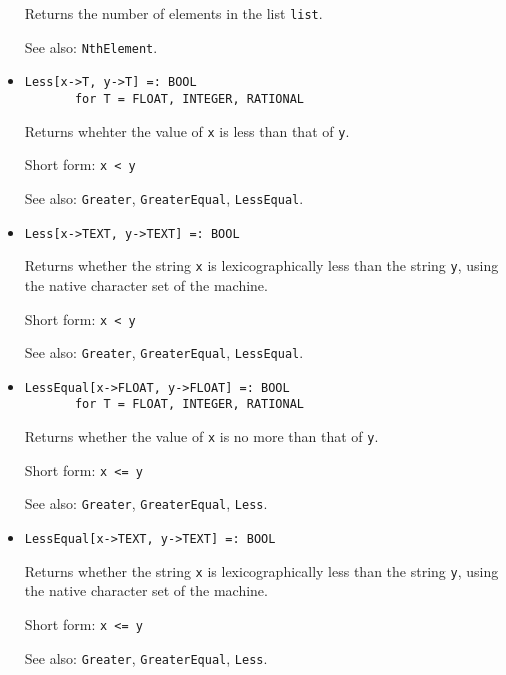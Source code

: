 \begin{itemize}
\bd
Returns the number of elements in the list \verb+list+.
\item
[See also:] {\tt NthElement}.
\ed

\item
\protect \large \begin{verbatim}
Less[x->T, y->T] =: BOOL
       for T = FLOAT, INTEGER, RATIONAL
\end{verbatim}\normalsize

\bd
Returns whehter the value of \verb+x+ is less than that of
\verb+y+.
\item
[Short form:] \verb+x < y+
\item
[See also:] {\tt Greater}, {\tt GreaterEqual}, {\tt LessEqual}.
\ed

\item
\protect \large \begin{verbatim}
Less[x->TEXT, y->TEXT] =: BOOL
\end{verbatim}\normalsize

\bd
Returns whether the string \verb+x+ is lexicographically less than
the string \verb+y+, using the native character set of the machine.
\item
[Short form:] \verb+x < y+
\item
[See also:] {\tt Greater}, {\tt GreaterEqual}, {\tt LessEqual}.
\ed

\item
\protect \large \begin{verbatim}
LessEqual[x->FLOAT, y->FLOAT] =: BOOL
       for T = FLOAT, INTEGER, RATIONAL
\end{verbatim}\normalsize

\bd
Returns whether the value of \verb+x+ is no more than that
of \verb+y+.
\item
[Short form:] \verb+x <= y+
\item
[See also:] {\tt Greater}, {\tt GreaterEqual}, {\tt Less}.
\ed

\item
\protect \large \begin{verbatim}
LessEqual[x->TEXT, y->TEXT] =: BOOL
\end{verbatim}\normalsize

\bd
Returns whether the string \verb+x+ is lexicographically less than
the string \verb+y+, using the native character set of the machine.
\item
[Short form:] \verb+x <= y+
\item
[See also:] {\tt Greater}, {\tt GreaterEqual}, {\tt Less}.
\ed


\end{itemize}
